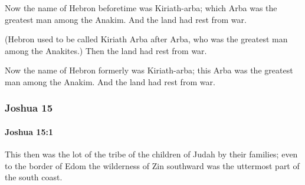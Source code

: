 			\begin{versebox}
					\item[BHS] 
					\item[ASV] Now the name of Hebron beforetime was Kiriath-arba; which Arba was the greatest man among the Anakim. And the land had rest from war.
					\item[NIV] (Hebron used to be called Kiriath Arba after Arba, who was the greatest man among the Anakites.) Then the land had rest from war.
					\item[NRSV] Now the name of Hebron formerly was Kiriath-arba; this Arba was the greatest man among the Anakim. And the land had rest from war.
			\end{versebox}
	\subsubsection{Joshua 15} %
		\label{JOSHUA-15}

		\paragraph{Joshua 15:1} %
			\label{JOSHUA-15-1}

			This then was the lot of the tribe of the children of Judah by their families; even to the border of Edom the wilderness of Zin southward was the uttermost part of the south coast.

